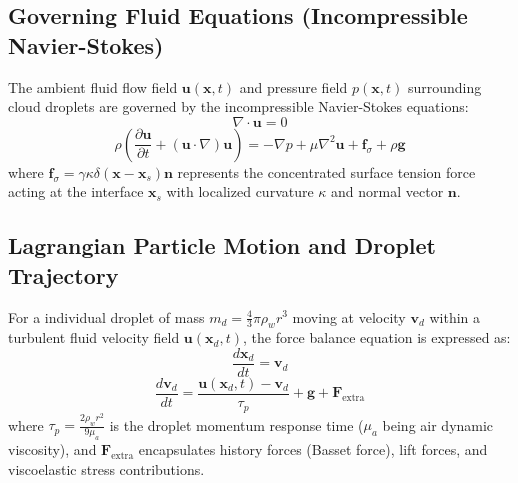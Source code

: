 \documentclass{article}
\begin{document}
\subsection{Governing Fluid Equations (Incompressible Navier-Stokes)}
The ambient fluid flow field $\mathbf{u}(\mathbf{x}, t)$ and pressure field $p(\mathbf{x}, t)$ surrounding cloud droplets are governed by the incompressible Navier-Stokes equations:
\begin{equation}
\nabla \cdot \mathbf{u} = 0
\end{equation}
\begin{equation}
\rho \left( \frac{\partial \mathbf{u}}{\partial t} + (\mathbf{u} \cdot \nabla)\mathbf{u} \right) = -\nabla p + \mu \nabla^2 \mathbf{u} + \mathbf{f}_\sigma + \rho \mathbf{g}
\end{equation}
where $\mathbf{f}_\sigma = \gamma \kappa \delta(\mathbf{x} - \mathbf{x}_s) \mathbf{n}$ represents the concentrated surface tension force acting at the interface $\mathbf{x}_s$ with localized curvature $\kappa$ and normal vector $\mathbf{n}$.

\subsection{Lagrangian Particle Motion and Droplet Trajectory}
For a individual droplet of mass $m_d = \frac{4}{3}\pi \rho_w r^3$ moving at velocity $\mathbf{v}_d$ within a turbulent fluid velocity field $\mathbf{u}(\mathbf{x}_d, t)$, the force balance equation is expressed as:
\begin{equation}
\frac{d\mathbf{x}_d}{dt} = \mathbf{v}_d
\end{equation}
\begin{equation}
\frac{d\mathbf{v}_d}{dt} = \frac{\mathbf{u}(\mathbf{x}_d, t) - \mathbf{v}_d}{\tau_p} + \mathbf{g} + \mathbf{F}_{\text{extra}}
\end{equation}
where $\tau_p = \frac{2 \rho_w r^2}{9 \mu_a}$ is the droplet momentum response time ($\mu_a$ being air dynamic viscosity), and $\mathbf{F}_{\text{extra}}$ encapsulates history forces (Basset force), lift forces, and viscoelastic stress contributions.
\end{document}
